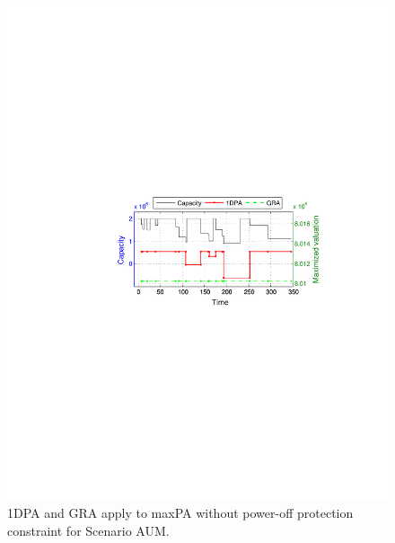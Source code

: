 \begin{figure}[!htb]\vspace{-5pt}
	\begin{center}
		\includegraphics[scale=0.6]{fig/maxPa.pdf}
	\end{center}\vspace{-5pt}
\caption{{\sc 1DPA} and {\sc GRA} apply to {\sc maxPA} without power-off protection constraint for Scenario AUM.}
	\label{fig:maxpa}
\end{figure}

